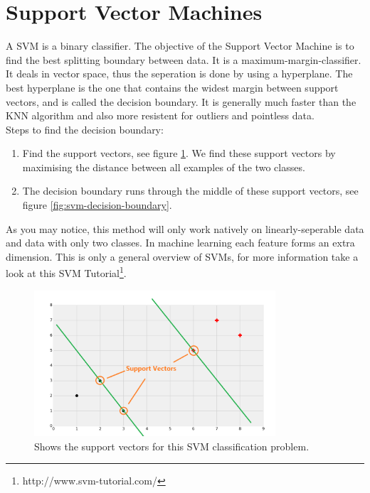 \section{Support Vector Machines}
A SVM is a binary classifier. The objective of the Support Vector Machine is to find the best splitting boundary between data. It is a maximum-margin-classifier. It deals in vector space, thus the seperation is done by using a hyperplane. The best hyperplane is the one that contains the widest margin between support vectors, and is called the decision boundary. It is generally much faster than the KNN algorithm and also more resistent for outliers and pointless data.
\\
\noindent Steps to find the decision boundary:
\begin{enumerate}
\item Find the support vectors, see figure \ref{fig:svm-support-vectors}. We find these support vectors by maximising the distance between all examples of the two classes.
\item The decision boundary runs through the middle of these support vectors, see figure \ref{fig:svm-decision-boundary}.
\end{enumerate}

As you may notice, this method will only work natively on linearly-seperable data and data with only two classes.
In machine learning each feature forms an extra dimension. This is only a general overview of SVMs, for more information take a look at this SVM Tutorial\footnote{http://www.svm-tutorial.com/}.

\begin{figure}
\centering
\includegraphics[width=0.8\textwidth]{images/svm-support-vectors.png}
\caption{\label{fig:svm-support-vectors} Shows the support vectors for this SVM classification problem.}
\end{figure}

